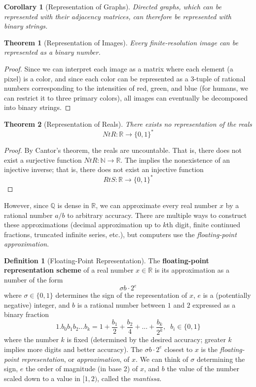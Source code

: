 \documentclass[a4paper, 12pt]{report}
\newtheorem{theorem}{Theorem}[section]
\newtheorem{corollary}{Corollary}[theorem]
\theoremstyle{remark}
\theoremstyle{definition}
\newtheorem{definition}{Definition}[section]
\begin{document}
\begin{corollary}[Representation of Graphs]
Directed graphs, which can be represented with their adjacency matrices, can therefore be represented with binary strings. 
\end{corollary}

\begin{theorem}[Representation of Images]
Every finite-resolution image can be represented as a binary number. 
\end{theorem}
\begin{proof}
Since we can interpret each image as a matrix where each element (a pixel) is a color, and since each color can be represented as a 3-tuple of rational numbers corresponding to the intensities of red, green, and blue (for humans, we can restrict it to three primary colors), all images can eventually be decomposed into binary strings. 
\end{proof}

\begin{theorem}[Representation of Reals]
There exists no representation of the reals
\[NtR: \mathbb{R} \longrightarrow \{0, 1\}^*\]
\end{theorem}
\begin{proof}
By Cantor's theorem, the reals are uncountable. That is, there does not exist a surjective function $NtR: \mathbb{N} \longrightarrow \mathbb{R}$. The implies the nonexistence of an injective inverse; that is, there does not exist an injective function 
\[RtS: \mathbb{R} \longrightarrow \{0,1\}^*\]
\end{proof}

However, since $\mathbb{Q}$ is dense in $\mathbb{R}$, we can approximate every real number $x$ by a rational number $a/b$ to arbitrary accuracy. There are multiple ways to construct these approximations (decimal approximation up to $k$th digit, finite continued fractions, truncated infinite series, etc.), but computers use the \textit{floating-point approximation}. 

\begin{definition}[Floating-Point Representation]
The \textbf{floating-point representation scheme} of a real number $x \in \mathbb{R}$ is its approximation as a number of the form 
\[\sigma b \cdot 2^e\]
where $\sigma \in \{0, 1\}$ determines the sign of the representation of $x$, $e$ is a (potentially negative) integer, and $b$ is a rational number between $1$ and $2$ expressed as a binary fraction 
\[1.b_0 b_1 b_2 ... b_k = 1 + \frac{b_1}{2} + \frac{b_2}{4} + ... + \frac{b_k}{2^k}, \;\; b_i \in \{0,1\}\]
where the number $k$ is fixed (determined by the desired accuracy; greater $k$ implies more digits and better accuracy). The $\sigma b \cdot 2^e$ closest to $x$ is the \textit{floating-point representation}, or \textit{approximation}, of $x$. We can think of $\sigma$ determining the sign, $e$ the order of magnitude (in base 2) of $x$, and $b$ the value of the number scaled down to a value in $[1,2)$, called the \textit{mantissa}. 
\end{definition}
\end{document}
